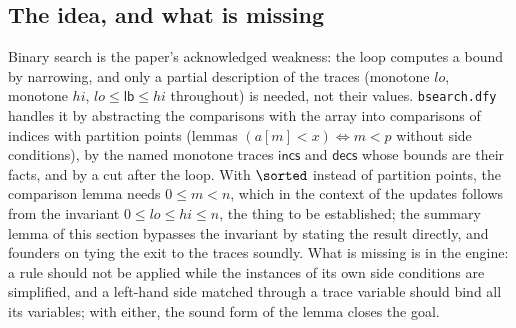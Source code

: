 \subsection{The idea, and what is missing}
Binary search is the paper's acknowledged weakness: the loop computes a bound by narrowing, and only a
partial description of the traces (monotone $lo$, monotone $hi$, $lo \le \mathsf{lb} \le hi$ throughout) is
needed, not their values. \texttt{bsearch.dfy} handles it by abstracting the comparisons with the array
into comparisons of indices with partition points (lemmas $(a[m] < x) \Leftrightarrow m < p$ without side
conditions), by the named monotone traces $\mathsf{incs}$ and $\mathsf{decs}$ whose bounds are their
facts, and by a cut after the loop. With $\sorted$ instead of partition points, the comparison lemma needs
$0 \le m < n$, which in the context of the updates follows from the invariant $0 \le lo \le hi \le n$,
the thing to be established; the summary lemma of this section bypasses the invariant by stating the
result directly, and founders on tying the exit to the traces soundly. What is missing is in the engine: a
rule should not be applied while the instances of its own side conditions are simplified, and a left-hand
side matched through a trace variable should bind all its variables; with either, the sound form of the
lemma closes the goal.
